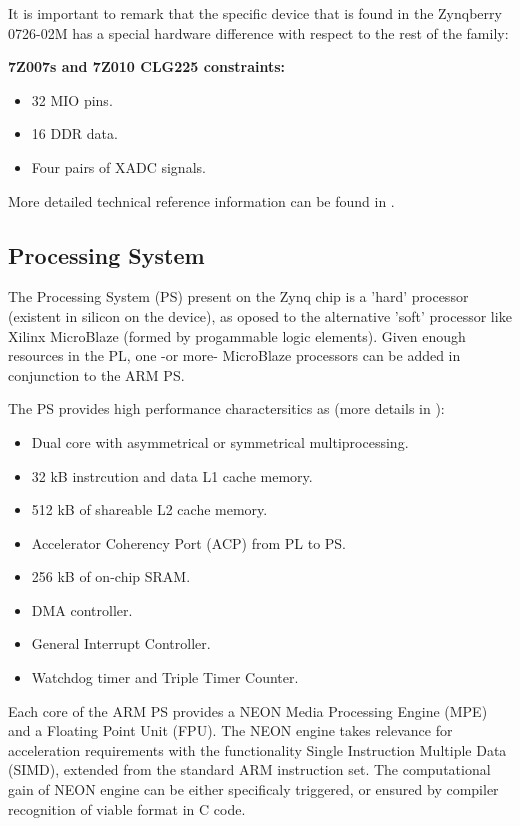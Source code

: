It is important to remark that the specific device that is found in the Zynqberry 0726-02M has a
special hardware difference with respect to the rest of the family:
\begin{quote} 
	\centering 
\end{quote}
\textbf{7Z007s and 7Z010 CLG225 constraints:}
\begin{itemize}
	\item 32 MIO pins.
	\item 16 DDR data.
	\item Four pairs of XADC signals.
\end{itemize}

More detailed technical reference information can be found in \cite[p.~30]{UG585}.

\subsection{Processing System}

The Processing System (PS) present on the Zynq chip is a 'hard' processor (existent in silicon on
the device), as oposed to the alternative 'soft' processor like Xilinx MicroBlaze (formed by
progammable logic elements). Given enough resources in the PL, one -or more- MicroBlaze processors
can be added in conjunction to the ARM PS. 

The PS provides high performance charactersitics as (more details in \cite[p.~32]{UG585}):
\begin{itemize}
	\item Dual core with asymmetrical or symmetrical multiprocessing.
	\item 32 kB instrcution and data L1 cache memory.
	\item 512 kB of shareable L2 cache memory.
	\item Accelerator Coherency Port (ACP) from PL to PS.
	\item 256 kB of on-chip SRAM.
	\item DMA controller.
	\item General Interrupt Controller.
	\item Watchdog timer and Triple Timer Counter.
\end{itemize}

Each core of the ARM PS provides a NEON Media Processing Engine (MPE) and a Floating Point Unit
(FPU). The NEON engine takes relevance for acceleration requirements with the functionality Single
Instruction Multiple Data (SIMD), extended from the standard ARM instruction set. The computational
gain of NEON engine can be either specificaly triggered, or ensured by compiler recognition of
viable format in C code.


